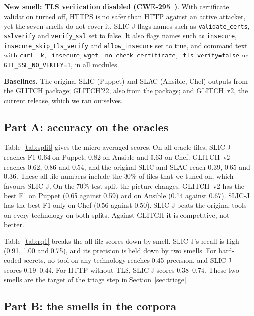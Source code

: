 \documentclass[conference]{IEEEtran}
\newcommand{\slicj}{SLIC-J}
\begin{document}
\textbf{New smell: TLS verification disabled (CWE-295~\cite{cwe295}).} With certificate validation turned off, HTTPS
is no safer than HTTP against an active attacker, yet the seven smells do not cover it. \slicj{} flags names such as
\texttt{validate\_certs}, \texttt{sslverify} and \texttt{verify\_ssl} set to false. It also flags names such as
\texttt{insecure}, \texttt{insecure\_skip\_tls\_verify} and \texttt{allow\_insecure} set to true, and command text
with \texttt{curl -k}, \texttt{--insecure}, \texttt{wget --no-check-certificate}, \texttt{--tls-verify=false} or
\texttt{GIT\_SSL\_NO\_VERIFY=1}, in all modules.

\textbf{Baselines.} The original SLIC (Puppet) and SLAC (Ansible, Chef) outputs from the GLITCH package; GLITCH'22,
also from the package; and GLITCH~v2, the current release, which we ran ourselves.

\subsection{Part A: accuracy on the oracles}


Table~\ref{tab:split} gives the micro-averaged scores. On all oracle files, \slicj{} reaches F1 0.64 on Puppet, 0.82
on Ansible and 0.63 on Chef. GLITCH~v2 reaches 0.62, 0.86 and 0.54, and the original SLIC and SLAC reach 0.39, 0.65 and
0.36. These all-file numbers include the 30\% of files that we tuned on, which favours \slicj{}. On the 70\% test split
the picture changes. GLITCH~v2 has the best F1 on Puppet (0.65 against 0.59) and on Ansible (0.74 against 0.67).
\slicj{} has the best F1 only on Chef (0.56 against 0.50). \slicj{} beats the original tools on every technology on
both splits. Against GLITCH it is competitive, not better.



Table~\ref{tab:rq1} breaks the all-file scores down by smell. \slicj{}'s recall is high (0.91, 1.00 and 0.75), and its
precision is held down by two smells. For hard-coded secrets, no tool on any technology reaches 0.45 precision, and
\slicj{} scores 0.19--0.44. For HTTP without TLS, \slicj{} scores 0.38--0.74. These two smells are the target of the
triage step in Section~\ref{sec:triage}.

\FloatBarrier
\subsection{Part B: the smells in the corpora}

\end{document}
